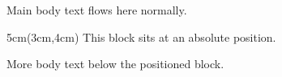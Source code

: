 \documentclass{article}
\begin{document}
Main body text flows here normally.
\begin{textblock*}{5cm}(3cm,4cm)
This block sits at an absolute position.
\end{textblock*}
More body text below the positioned block.
\end{document}
